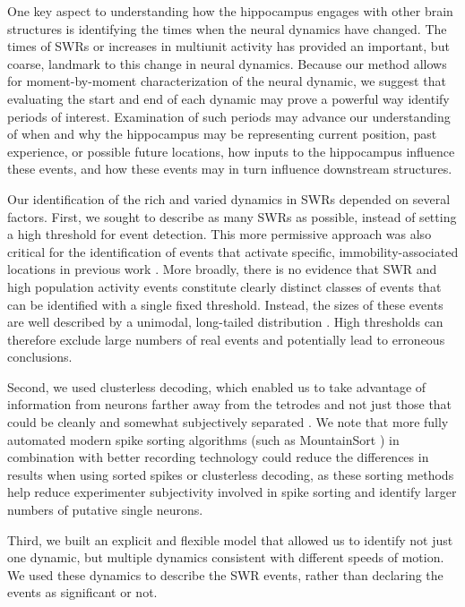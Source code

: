\documentclass[9pt,lineno]{elife}
\begin{document}
One key aspect to understanding how the hippocampus engages with other brain structures is identifying the times when the neural dynamics have changed. The times of SWRs or increases in multiunit activity  has provided an important, but coarse, landmark to this change in neural dynamics. Because our method allows for moment-by-moment characterization of the neural dynamic, we suggest that evaluating the start and end of each dynamic may prove a powerful way identify periods of interest. Examination of such periods may advance our understanding of when and why the hippocampus may be representing current position, past experience, or possible future locations, how inputs to the hippocampus influence these events, and how these events may in turn influence downstream structures.

Our identification of the rich and varied dynamics in SWRs depended on several factors. First, we sought to describe as many SWRs as possible, instead of setting a high threshold for event detection. This more permissive approach was also critical for the identification of events that activate specific, immobility-associated locations in previous work \citep{YuDistincthippocampalcorticalmemory2017}. More broadly, there is no evidence that SWR and high population activity events constitute clearly distinct classes of events that can be identified with a single fixed threshold. Instead, the sizes of these events are well described by a unimodal, long-tailed distribution \citep{YuDistincthippocampalcorticalmemory2017}. High thresholds can therefore exclude large numbers of real events and potentially lead to erroneous conclusions.

Second, we used clusterless decoding, which enabled us to take advantage of information from neurons farther away from the tetrodes and not just those that could be cleanly and somewhat subjectively separated \citep{ChenTransductiveneuraldecoding2012, KloostermanBayesiandecodingusing2014, DengRapidclassificationhippocampal2016}. We note that more fully automated modern spike sorting algorithms (such as MountainSort \citep{ChungFullyAutomatedApproach2017}) in combination with better recording technology could reduce the differences in results when using sorted spikes or clusterless decoding, as these sorting methods help reduce  experimenter subjectivity involved in spike sorting and identify larger numbers of putative single neurons.  

Third, we built an explicit and flexible model that allowed us to identify not just one dynamic, but multiple dynamics consistent with different speeds of motion. We used these dynamics to describe the SWR events, rather than declaring the events as significant or not.
\end{document}
